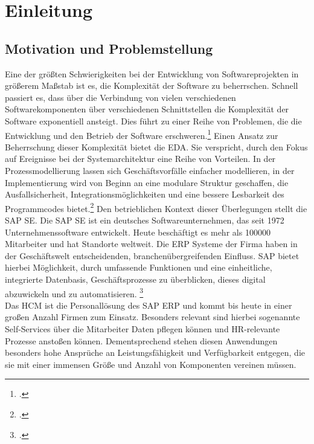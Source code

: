 \section{Einleitung}
\subsection{Motivation und Problemstellung}
Eine der größten Schwierigkeiten bei der Entwicklung von Softwareprojekten in größerem Maßstab ist es, die Komplexität der Software zu beherrschen. Schnell passiert es, dass über die Verbindung von vielen verschiedenen Softwarekomponenten über verschiedenen Schnittstellen die Komplexität der Software exponentiell ansteigt. Dies führt zu einer Reihe von Problemen, die die Entwicklung und den Betrieb der Software erschweren.\footcite[Vgl.][S. 5]{pressman2005software} Einen Ansatz zur Beherrschung dieser Komplexität bietet die \ac{EDA}. Sie verspricht, durch den Fokus auf Ereignisse bei der Systemarchitektur eine Reihe von Vorteilen. In der Prozessmodellierung lassen sich Geschäftsvorfälle einfacher modellieren, in der Implementierung wird von Beginn an eine modulare Struktur geschaffen, die Ausfallsicherheit, Integrationsmöglichkeiten und eine bessere Lesbarkeit des Programmcodes bietet.\footcite[Vgl. ][S. 8f]{EDA2010} Den betrieblichen Kontext dieser Überlegungen stellt die SAP SE. Die SAP SE ist ein deutsches Softwareunternehmen, das seit 1972 Unternehmenssoftware entwickelt. Heute beschäftigt es mehr als 100000 Mitarbeiter und hat Standorte weltweit. Die \ac{ERP} Systeme der Firma haben in der Geschäftswelt entscheidenden, branchenübergreifenden Einfluss. SAP bietet hierbei Möglichkeit, durch umfassende Funktionen und eine einheitliche, integrierte Datenbasis, Geschäftsprozesse zu überblicken, dieses digital abzuwickeln und zu automatisieren. \footcite[Vgl.][]{sapse_was} \\
Das HCM ist die Personallösung des SAP ERP und kommt bis heute in einer großen Anzahl Firmen zum Einsatz. Besonders relevant sind hierbei sogenannte Self-Services über die Mitarbeiter Daten pflegen können und HR-relevante Prozesse anstoßen können. Dementsprechend stehen diesen Anwendungen besonders hohe Ansprüche an Leistungsfähigkeit und Verfügbarkeit entgegen, die sie mit einer immensen Größe und Anzahl von Komponenten vereinen müssen.


